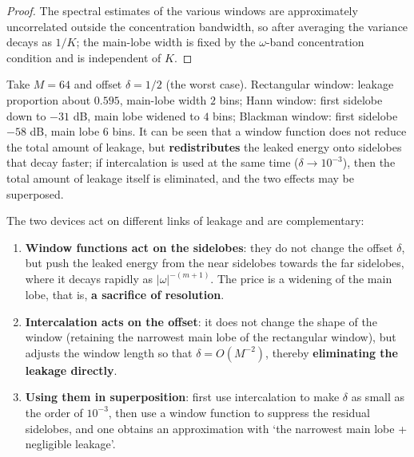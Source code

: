 \begin{proof}
The spectral estimates of the various windows are approximately uncorrelated outside the concentration bandwidth, so after averaging the variance decays as $1/K$; the main-lobe width is fixed by the $\omega$-band concentration condition and is independent of $K$.
\end{proof}

\begin{example}\label{ex:window_comparison_numeric}
Take $M=64$ and offset $\delta=1/2$ (the worst case). Rectangular window: leakage proportion about $0.595$, main-lobe width $2$ bins; Hann window: first sidelobe down to $-31$ dB, main lobe widened to $4$ bins; Blackman window: first sidelobe $-58$ dB, main lobe $6$ bins. It can be seen that a window function does not reduce the total amount of leakage, but \textbf{redistributes} the leaked energy onto sidelobes that decay faster; if intercalation is used at the same time ($\delta\to10^{-3}$), then the total amount of leakage itself is eliminated, and the two effects may be superposed.
\end{example}

\begin{remark}\label{rem:window_and_intercalation_complementarity}
The two devices act on different links of leakage and are complementary:
\begin{enumerate}[label=(\roman*)]
    \item \textbf{Window functions act on the sidelobes}: they do not change the offset $\delta$, but push the leaked energy from the near sidelobes towards the far sidelobes, where it decays rapidly as $|\omega|^{-(m+1)}$. The price is a widening of the main lobe, that is, \textbf{a sacrifice of resolution}.
    \item \textbf{Intercalation acts on the offset}: it does not change the shape of the window (retaining the narrowest main lobe of the rectangular window), but adjusts the window length so that $\delta=O(M^{-2})$, thereby \textbf{eliminating the leakage directly}.
    \item \textbf{Using them in superposition}: first use intercalation to make $\delta$ as small as the order of $10^{-3}$, then use a window function to suppress the residual sidelobes, and one obtains an approximation with `the narrowest main lobe + negligible leakage'.
\end{enumerate}
\end{remark}

